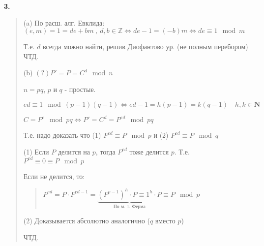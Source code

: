 \documentclass{article}
\begin{document}
\textbf{\textsf{3.}}
\begin{quote}
    (a) По расш. алг. Евклида: $(e, m) = 1 = de + bm \ , \ d,b \in \mathbb{Z} \Longleftrightarrow de - 1 = (-b)m \Longleftrightarrow de \equiv 1 \mod m \qquad $

    Т.е. $d$ всегда можно найти, решив Диофантово ур. (не полным перебором) ЧТД.

    (b) $(?) P' = P = C^d \mod n$
    
    $n = pq$, $p$ и $q$ - простые.

    $ed \equiv 1 \mod (p-1)(q-1) \Leftrightarrow ed - 1 = h(p - 1) = k(q - 1) \quad h, k \in \mathbf{N}$

    $C = P^e \mod pq \Longleftrightarrow P' = C^d = P^{ed} \mod pq$

    Т.е. надо доказать что (1) $P^{ed} \equiv P \mod p$ и (2) $P^{ed} \equiv P \mod q$

    (1) Если $P$ делится на $p$, тогда $P^{ed}$ тоже делится $p$. Т.е. $P^{ed} \equiv 0 \equiv P \mod p$

     Если не делится, то:
    \begin{quote}
        $P^{ed} = P \cdot P^{ed - 1} = \underbrace{(P^{p -1})^h \cdot P \equiv 1^h \cdot P}_{\text{По м. т. Ферма}} \equiv P \mod p$
    \end{quote}

    (2) Доказывается абсолютно аналогично ($q$ вместо $p$)

    ЧТД.
   
\end{quote}
\end{document}
